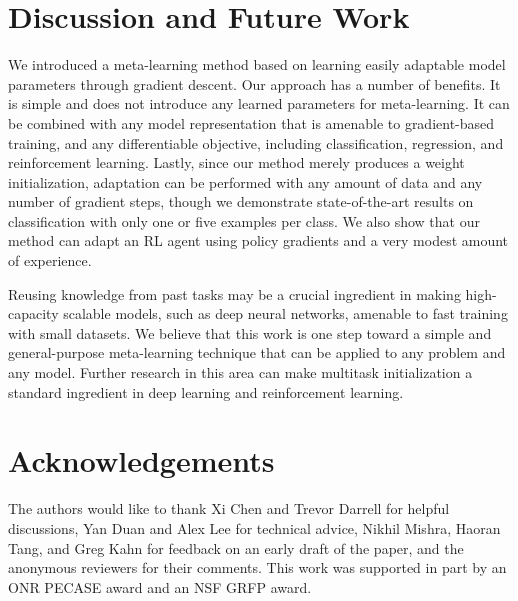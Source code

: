 \documentclass{article}
\begin{document}
\section{Discussion and Future Work}

We introduced a meta-learning method based on learning easily adaptable model parameters through gradient descent. Our approach has a number of benefits. It is simple and does not introduce any learned parameters for meta-learning. It can be combined with any model representation that is amenable to gradient-based training, and any differentiable objective, including classification, regression, and reinforcement learning. Lastly, since our method merely produces a weight initialization, adaptation can be performed with any amount of data and any number of gradient steps, though we demonstrate state-of-the-art results on classification with only one or five examples per class. We also show that our method can adapt an RL agent using policy gradients and a very modest amount of experience.


Reusing knowledge from past tasks may be a crucial ingredient in making high-capacity scalable models, such as deep neural networks, amenable to fast training with small datasets. We believe that this work is one step toward a simple and general-purpose meta-learning technique that can be applied to any problem and any model. Further research in this area can make multitask initialization a standard ingredient in deep learning and reinforcement learning.

\section*{Acknowledgements} The authors would like to thank Xi Chen and Trevor Darrell for helpful discussions, Yan Duan and Alex Lee for technical advice, Nikhil Mishra, Haoran Tang, and Greg Kahn for feedback on an early draft of the paper, and the anonymous reviewers for their comments. This work was supported in part by an ONR PECASE award and an NSF GRFP award.


\end{document}
